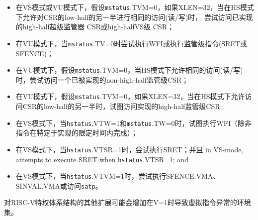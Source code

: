 \begin{itemize}
\item
在VS模式或VU模式下，假设{\tt mstatus}.TVM=0，如果XLEN=32，当在HS模式下允许对CSR的low-half的另一半进行相同的访问(读/写)时，
尝试访问已实现的high-half超级监管器 CSR或high-halfVS级 CSR；

\item
在VU模式下，当{\tt mstatus}.TV=0时尝试执行WFI或执行监管级指令(SRET或SFENCE)；

\item
在VU模式下，假设{\tt mstatus}.TVM=0，当HS模式下允许相同的访问(读/写)时，尝试访问一个已被实现的non-high-half监管级CSR；

\item
在VU模式下，假设{\tt mstatus}.TVM=0，如果XLEN=32，当在HS模式下允许访问CSR的low-half的另一半时，试图访问实现的high-half监管级CSR;

\item
在VS模式下，当{\tt hstatus}.VTW=1和{\tt mstatus}.TW=0时，试图执行WFI（除非指令在特定于实现的限定时间内完成）；

\item
在VS模式下，当{\tt hstatus}.VTSR=1时，尝试执行SRET；并且
in VS-mode, attempts to execute SRET when {\tt hstatus}.VTSR=1; and

\item
在VS模式下，当{\tt hstatus}.VTVM=1时，尝试执行SFENCE.VMA、SINVAL.VMA或访问{\tt satp}。

\end{itemize}
对\mbox{RISC-V}特权体系结构的其他扩展可能会增加在V=1时导致虚拟指令异常的环境集。

